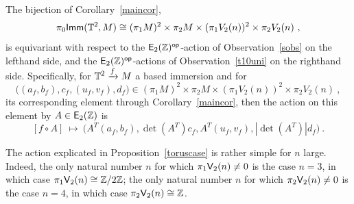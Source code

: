 \begin{prop}
\label{toruscase}
The bijection of Corollary~\ref{maincor},
\[
\pi_{0}{\sf Imm}(\mathbb T^{2}, M) \cong (\pi_{1}M)^{2} \times \pi_{2}M \times (\pi_{1}V_{2}(n))^{2} \times \pi_{2}V_{2}(n) ~,
\]
is equivariant with respect to the $\mathsf E_2(\mathbb Z)^{\operatorname{\mathsf{op}}}$-action of Observation~\ref{sobs} on the lefthand side, and the $\mathsf E_2(\mathbb Z)^{\operatorname{\mathsf{op}}}$-actions of Observation~\ref{t10uni} on the righthand side.
Specifically, for $\mathbb T^2 \xrightarrow{f} M$ a based immersion and for 
\[
\bigl((a_f,b_f), c_{f}, (u_{f}, v_{f}), d_{f} \bigr) \in (\pi_{1}M)^{2} \times \pi_{2}M \times (\pi_{1}V_{2}(n))^{2} \times \pi_{2}V_{2}(n)
~,
\] 
its corresponding element through Corollary~\ref{maincor}, then the action on this element by $A\in \mathsf E_2(\mathbb Z)$ is
\[
[f \circ A] 
~\mapsto ~
\bigl(A^{T}(a_f,b_f), \det(A^T)c_{f}, A^{T}(u_{f}, v_{f}), | \det(A^T)| d_{f} \bigr)~.
\]


\end{prop}



\begin{remark}
The action explicated in Proposition~\ref{toruscase} is rather simple for $n$ large.
Indeed, the only natural number $n$ for which $\pi_1\mathsf V_2(n) \neq 0$ is the case $n=3$, in which case $\pi_1\mathsf V_2(n) \cong \mathbb Z/2\mathbb Z$;
the only natural number $n$ for which $\pi_2\mathsf V_2(n) \neq 0$ is the case $n=4$, in which case $\pi_2\mathsf V_2(n) \cong \mathbb Z$.  
\end{remark}





